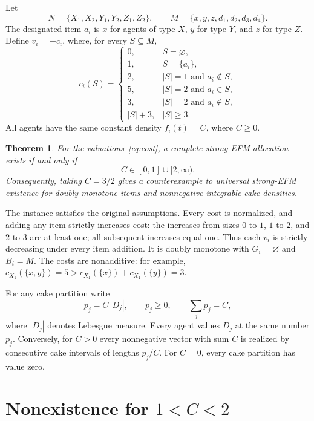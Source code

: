 \documentclass[11pt,a4paper]{article}
\newtheorem{theorem}{Theorem}
\begin{document}
Let
\[
 N=\{X_1,X_2,Y_1,Y_2,Z_1,Z_2\},\qquad
 M=\{x,y,z,d_1,d_2,d_3,d_4\}.
\]
The designated item $a_i$ is $x$ for agents of type $X$, $y$ for type
$Y$, and $z$ for type $Z$. Define $v_i=-c_i$, where, for every $S\subseteq M$,
\begin{equation}\label{eq:cost}
 c_i(S)=
 \begin{cases}
 0,&S=\varnothing,\\
 1,&S=\{a_i\},\\
 2,&|S|=1\text{ and }a_i\notin S,\\
 5,&|S|=2\text{ and }a_i\in S,\\
 3,&|S|=2\text{ and }a_i\notin S,\\
 |S|+3,&|S|\geq3.
 \end{cases}
\end{equation}
All agents have the same constant density $f_i(t)=C$, where $C\geq0$.

\begin{theorem}\label{thm:main}
For the valuations~\eqref{eq:cost}, a complete strong-EFM allocation
exists if and only if
\[
 C\in[0,1]\cup[2,\infty).
\]
Consequently, taking $C=3/2$ gives a counterexample to universal strong-EFM
existence for doubly monotone items and nonnegative integrable cake densities.
\end{theorem}

The instance satisfies the original assumptions.
Every cost is normalized, and adding any item strictly
increases cost: the increases from sizes $0$ to $1$, $1$ to $2$, and
$2$ to $3$ are at least one; all subsequent increases equal one.
Thus each $v_i$ is strictly decreasing under every item addition.
It is doubly monotone with $G_i=\varnothing$ and $B_i=M$.
The costs are nonadditive: for example,
$c_{X_1}(\{x,y\})=5>c_{X_1}(\{x\})+c_{X_1}(\{y\})=3$.

For any cake partition write
\begin{equation}\label{eq:payments}
 p_j=C\,|D_j|,\qquad p_j\geq0,\qquad \sum_jp_j=C,
\end{equation}
where $|D_j|$ denotes Lebesgue measure. Every agent values $D_j$ at the
same number $p_j$. Conversely, for $C>0$ every nonnegative vector with
sum $C$ is realized by consecutive cake intervals of lengths $p_j/C$.
For $C=0$, every cake partition has value zero.

\section{Nonexistence for \texorpdfstring{$1<C<2$}{1<C<2}}
\end{document}
